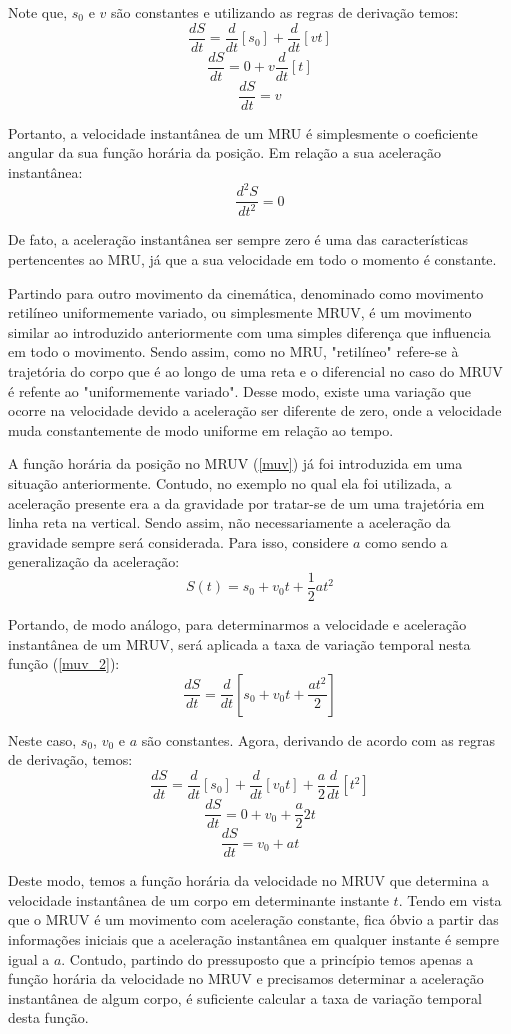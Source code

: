 \documentclass[
	12pt,				%
	openright,			%
    twoside,			%
	a4paper,			%
	chapter=TITLE,		%
	english,			%
	french,				%
	spanish,			%
	brazil				%
	]{abntex2}
\numberwithin{lema}{chapter}
\numberwithin{teorema}{chapter}
\numberwithin{definicao}{chapter}
\numberwithin{exemplo}{chapter}
\numberwithin{figure}{chapter}
\begin{document}
Note que, $s_0$ e $v$ são constantes e utilizando as regras de derivação temos:
$$\dfrac{dS}{dt} = \dfrac{d}{dt}[s_0] + \dfrac{d}{dt}[vt]$$
$$\dfrac{dS}{dt} = 0 + v\dfrac{d}{dt}[t]$$
$$\dfrac{dS}{dt} = v$$

Portanto, a velocidade instantânea de um MRU é simplesmente o coeficiente angular da sua função horária da posição. Em relação a sua aceleração instantânea:
$$\dfrac{d^{2}S}{dt^{2}} = 0$$

De fato, a aceleração instantânea ser sempre zero é uma das características pertencentes ao MRU, já que a sua velocidade em todo o momento é constante.

Partindo para outro movimento da cinemática, denominado como movimento retilíneo uniformemente variado, ou simplesmente MRUV, é um movimento similar ao introduzido anteriormente com uma simples diferença que influencia em todo o movimento. Sendo assim, como no MRU, "retilíneo" refere-se à trajetória do corpo que é ao longo de uma reta e o diferencial no caso do MRUV é refente ao "uniformemente variado". Desse modo, existe uma variação que ocorre na velocidade devido a aceleração ser diferente de zero, onde a velocidade muda constantemente de modo uniforme em relação ao tempo. 

A função horária da posição no MRUV (\ref{muv}) já foi introduzida em uma situação anteriormente. Contudo, no exemplo no qual ela foi utilizada, a aceleração presente era a da gravidade por tratar-se de um uma trajetória em linha reta na vertical. Sendo assim, não necessariamente a aceleração da gravidade sempre será considerada. Para isso, considere $a$ como sendo a generalização da aceleração:
\begin{equation}
	\label{muv_2}
	S(t) = s_0 + v_0t + \dfrac{1}{2}at^{2}
\end{equation}

Portando, de modo análogo, para determinarmos a velocidade e aceleração instantânea de um MRUV, será aplicada a taxa de variação temporal nesta função (\ref{muv_2}):
$$\dfrac{dS}{dt} = \dfrac{d}{dt}\left[s_0 + v_0t + \dfrac{at^{2}}{2}\right]$$

Neste caso, $s_0$, $v_0$ e $a$ são constantes. Agora, derivando de acordo com as regras de derivação, temos:
$$\dfrac{dS}{dt} = \dfrac{d}{dt}[s_0] + \dfrac{d}{dt}[v_0t] + \dfrac{a}{2} \dfrac{d}{dt}\left[t^{2}\right]$$
$$\dfrac{dS}{dt} = 0 + v_0 + \dfrac{a}{2}2t$$
$$\dfrac{dS}{dt} = v_0 + at$$

Deste modo, temos a função horária da velocidade no MRUV que determina a velocidade instantânea de um corpo em determinante instante $t$. Tendo em vista que o MRUV é um movimento com aceleração constante, fica óbvio a partir das informações iniciais que a aceleração instantânea em qualquer instante é sempre igual a $a$. Contudo, partindo do pressuposto que a princípio temos apenas a função horária da velocidade no MRUV e precisamos determinar a aceleração instantânea de algum corpo, é suficiente calcular a taxa de variação temporal desta função.
\end{document}
